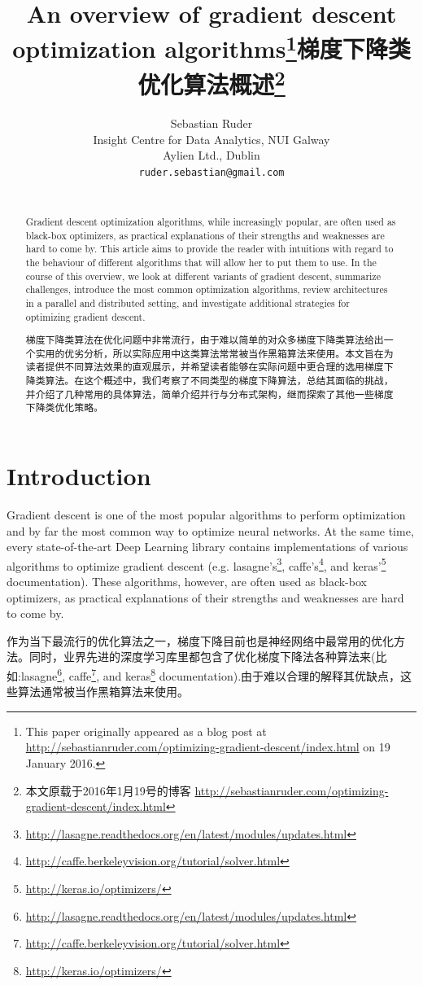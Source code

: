 \documentclass{article}
\title{An overview of gradient descent optimization algorithms\thanks{This paper originally appeared as a blog post at \url{http://sebastianruder.com/optimizing-gradient-descent/index.html} on 19 January 2016.}}
\title{梯度下降类优化算法概述\thanks{本文原载于2016年1月19号的博客 \url{http://sebastianruder.com/optimizing-gradient-descent/index.html}}}
\author{
  Sebastian Ruder\\
  Insight Centre for Data Analytics, NUI Galway\\
  Aylien Ltd., Dublin\\
  \texttt{ruder.sebastian@gmail.com}\\
  \text{翻译:管枫(初)，彭博(复)，张永彬(审)}
}
\begin{document}
\maketitle

\begin{abstract}
Gradient descent optimization algorithms, while increasingly popular, are often used as black-box optimizers, as practical explanations of their strengths and weaknesses are hard to come by. This article aims to provide the reader with intuitions with regard to the behaviour of different algorithms that will allow her to put them to use. In the course of this overview, we look at different variants of gradient descent, summarize challenges, introduce the most common optimization algorithms, review architectures in a parallel and distributed setting, and investigate additional strategies for optimizing gradient descent.

梯度下降类算法在优化问题中非常流行，由于难以简单的对众多梯度下降类算法给出一个实用的优劣分析，所以实际应用中这类算法常常被当作黑箱算法来使用。本文旨在为读者提供不同算法效果的直观展示，并希望读者能够在实际问题中更合理的选用梯度下降类算法。在这个概述中，我们考察了不同类型的梯度下降算法，总结其面临的挑战，并介绍了几种常用的具体算法，简单介绍并行与分布式架构，继而探索了其他一些梯度下降类优化策略。
\end{abstract}

\section{Introduction}

Gradient descent is one of the most popular algorithms to perform optimization and by far the most common way to optimize neural networks. At the same time, every state-of-the-art Deep Learning library contains implementations of various algorithms to optimize gradient descent (e.g. lasagne's\footnote{\url{http://lasagne.readthedocs.org/en/latest/modules/updates.html}}, caffe's\footnote{\url{http://caffe.berkeleyvision.org/tutorial/solver.html}}, and keras'\footnote{\url{http://keras.io/optimizers/}} documentation). These algorithms, however, are often used as black-box optimizers, as practical explanations of their strengths and weaknesses are hard to come by.

作为当下最流行的优化算法之一，梯度下降目前也是神经网络中最常用的优化方法。同时，业界先进的深度学习库里都包含了优化梯度下降法各种算法来(比如:lasagne\footnote{\url{http://lasagne.readthedocs.org/en/latest/modules/updates.html}}, caffe\footnote{\url{http://caffe.berkeleyvision.org/tutorial/solver.html}}, and keras\footnote{\url{http://keras.io/optimizers/}} documentation).由于难以合理的解释其优缺点，这些算法通常被当作黑箱算法来使用。
\end{document}
